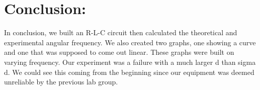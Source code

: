 \documentclass{article}
\begin{document}
\section*{Conclusion:}
In conclusion, we built an R-L-C circuit then calculated the theoretical and experimental angular frequency.  We also created two graphs, one showing a curve and one that was supposed to come out linear.  These graphs were built on varying frequency.  Our experiment was a failure with a much larger d than sigma d.  We could see this coming from the beginning since our equipment was deemed unreliable by the previous lab group.
\end{document}
